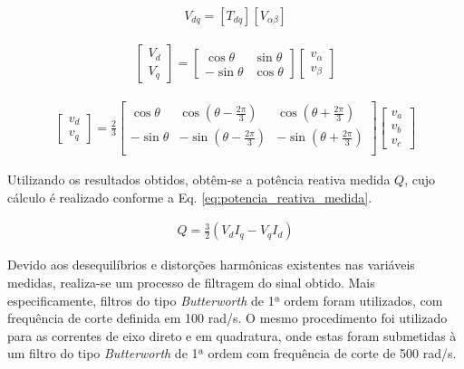 \begin{align}
V_{dq} = [T_{dq}][V_{\alpha \beta}]
\end{align}

\begin{align}\label{eq:matrix_transformacao}
\begin{bmatrix}
	V_d \\ V_q
\end{bmatrix} = 
\begin{bmatrix}
	\cos{\theta} & \sin{\theta} \\
	-\sin{\theta} & \cos{\theta}
\end{bmatrix}
\begin{bmatrix}
	v_{\alpha} \\ v_{\beta}
\end{bmatrix}
\end{align}

\begin{align}\label{eq:matriz_transformacao_2}
	\begin{bmatrix}
		v_d \\ v_q
	\end{bmatrix} = \frac{2}{3}
	\begin{bmatrix}
		\cos{\theta} & \cos(\theta - \frac{2\pi}{3}) & \cos(\theta + \frac{2\pi}{3}) \\
		-\sin{\theta} & -\sin(\theta - \frac{2\pi}{3}) & -\sin(\theta + \frac{2\pi}{3}) \\
	\end{bmatrix}
	\begin{bmatrix}
		v_a \\ v_b \\ v_c
	\end{bmatrix}
\end{align}

Utilizando os resultados obtidos, obtêm-se a potência reativa medida $Q$, cujo cálculo é realizado conforme a Eq. \ref{eq:potencia_reativa_medida}.

\begin{align}\label{eq:potencia_reativa_medida}
	Q = \frac{3}{2}(V_d I_q - V_q I_d)
\end{align}

Devido aos desequilíbrios e distorções harmônicas existentes nas variáveis medidas, realiza-se um processo de filtragem do sinal obtido. Mais especificamente, filtros do tipo \textit{Butterworth} de 1ª ordem foram utilizados, com frequência de corte definida em 100 rad/s. O mesmo procedimento foi utilizado para as correntes de eixo direto e em quadratura, onde estas foram submetidas à um filtro do tipo \textit{Butterworth} de 1ª ordem com frequência de corte de 500 rad/s.

